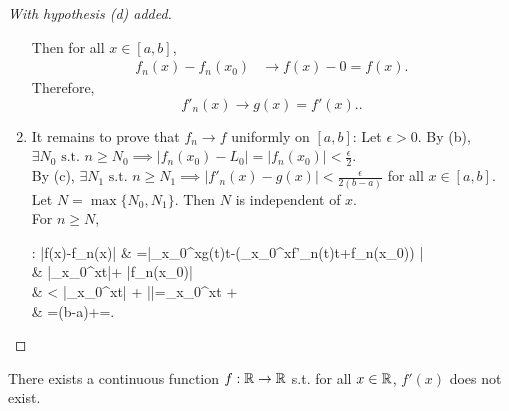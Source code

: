 \begin{thm}[17]
\begin{proof}[With hypothesis (d) added]
\begin{enumerate}[label=\arabic*.]
			      Then for all $x \in [a,b]$,
			      \begin{align*}
				      f_{n}(x)-f_n(x_0) & \to f(x)-0=f(x).
			      \end{align*}
			      Therefore,
			      \[
				      f'_{n}(x)         \to g(x)=f'(x).
				      .\]
			\item It remains to prove that $f_{n}\to f$ uniformly on $[a,b]$:
			      Let $\epsilon>0$.
			      By (b), $\exists{N_0} \text{ s.t. } n\ge N_0 \implies \left|f_{n}(x_0)-L_0\right|=\left|f_{n}(x_0)\right|<\frac{\epsilon}{2}$.\\
			      By (c), $\exists{N_1} \text{ s.t. } n\ge N_1 \implies \left|f'_{n}(x)-g(x)\right|<\frac{\epsilon}{2(b-a)}$ for all $x \in [a,b]$.\\
			      Let $N=\max\{N_0,N_1\}$.
			      Then $N$ is independent of $x$. \\
			      For $n\ge N$,
			      \begin{flalign*}
				      : \left|f(x)-f_{n}(x)\right| & =\left|\int_{x_0}^{x}{g(t)t}-\left(\int_{x_0}^{x}{f'_{n}(t)t}+f_{n}(x_0)\right) \right|                                                                 \\
				                                                       & \le  \left|\int_{x_0}^{x}{\left[ g(t)-f'_{n}(t) \right] t}\right|+ \left|f_{n}(x_0)\right|                                                                        \\
				                                                       & < \left|\int_{x_0}^{x}{t}\right| + \left|\right|=\int_{x_0}^{x}{t} +  \\
				                                                       & =\cdot (b-a)+=\epsilon.
			      \end{flalign*}
		\end{enumerate}
	\end{proof}
\end{thm}
\begin{thm}[18]
	There exists a continuous function $f: \mathbb{R}\to \mathbb{R}$ s.t. for all $x \in \mathbb{R}$, $f'(x)$ does not exist.
\end{thm}
